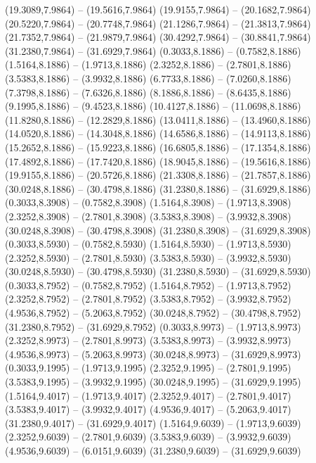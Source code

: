 {\begin{scope}[shift={(#1,#2)}]
    (19.3089,7.9864) -- (19.5616,7.9864)
    (19.9155,7.9864) -- (20.1682,7.9864)
    (20.5220,7.9864) -- (20.7748,7.9864)
    (21.1286,7.9864) -- (21.3813,7.9864)
    (21.7352,7.9864) -- (21.9879,7.9864)
    (30.4292,7.9864) -- (30.8841,7.9864)
    (31.2380,7.9864) -- (31.6929,7.9864)
    (0.3033,8.1886) -- (0.7582,8.1886)
    (1.5164,8.1886) -- (1.9713,8.1886)
    (2.3252,8.1886) -- (2.7801,8.1886)
    (3.5383,8.1886) -- (3.9932,8.1886)
    (6.7733,8.1886) -- (7.0260,8.1886)
    (7.3798,8.1886) -- (7.6326,8.1886)
    (8.1886,8.1886) -- (8.6435,8.1886)
    (9.1995,8.1886) -- (9.4523,8.1886)
    (10.4127,8.1886) -- (11.0698,8.1886)
    (11.8280,8.1886) -- (12.2829,8.1886)
    (13.0411,8.1886) -- (13.4960,8.1886)
    (14.0520,8.1886) -- (14.3048,8.1886)
    (14.6586,8.1886) -- (14.9113,8.1886)
    (15.2652,8.1886) -- (15.9223,8.1886)
    (16.6805,8.1886) -- (17.1354,8.1886)
    (17.4892,8.1886) -- (17.7420,8.1886)
    (18.9045,8.1886) -- (19.5616,8.1886)
    (19.9155,8.1886) -- (20.5726,8.1886)
    (21.3308,8.1886) -- (21.7857,8.1886)
    (30.0248,8.1886) -- (30.4798,8.1886)
    (31.2380,8.1886) -- (31.6929,8.1886)
    (0.3033,8.3908) -- (0.7582,8.3908)
    (1.5164,8.3908) -- (1.9713,8.3908)
    (2.3252,8.3908) -- (2.7801,8.3908)
    (3.5383,8.3908) -- (3.9932,8.3908)
    (30.0248,8.3908) -- (30.4798,8.3908)
    (31.2380,8.3908) -- (31.6929,8.3908)
    (0.3033,8.5930) -- (0.7582,8.5930)
    (1.5164,8.5930) -- (1.9713,8.5930)
    (2.3252,8.5930) -- (2.7801,8.5930)
    (3.5383,8.5930) -- (3.9932,8.5930)
    (30.0248,8.5930) -- (30.4798,8.5930)
    (31.2380,8.5930) -- (31.6929,8.5930)
    (0.3033,8.7952) -- (0.7582,8.7952)
    (1.5164,8.7952) -- (1.9713,8.7952)
    (2.3252,8.7952) -- (2.7801,8.7952)
    (3.5383,8.7952) -- (3.9932,8.7952)
    (4.9536,8.7952) -- (5.2063,8.7952)
    (30.0248,8.7952) -- (30.4798,8.7952)
    (31.2380,8.7952) -- (31.6929,8.7952)
    (0.3033,8.9973) -- (1.9713,8.9973)
    (2.3252,8.9973) -- (2.7801,8.9973)
    (3.5383,8.9973) -- (3.9932,8.9973)
    (4.9536,8.9973) -- (5.2063,8.9973)
    (30.0248,8.9973) -- (31.6929,8.9973)
    (0.3033,9.1995) -- (1.9713,9.1995)
    (2.3252,9.1995) -- (2.7801,9.1995)
    (3.5383,9.1995) -- (3.9932,9.1995)
    (30.0248,9.1995) -- (31.6929,9.1995)
    (1.5164,9.4017) -- (1.9713,9.4017)
    (2.3252,9.4017) -- (2.7801,9.4017)
    (3.5383,9.4017) -- (3.9932,9.4017)
    (4.9536,9.4017) -- (5.2063,9.4017)
    (31.2380,9.4017) -- (31.6929,9.4017)
    (1.5164,9.6039) -- (1.9713,9.6039)
    (2.3252,9.6039) -- (2.7801,9.6039)
    (3.5383,9.6039) -- (3.9932,9.6039)
    (4.9536,9.6039) -- (6.0151,9.6039)
    (31.2380,9.6039) -- (31.6929,9.6039)

\end{scope}}
